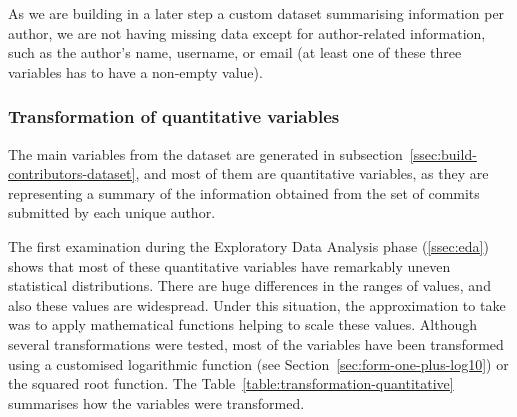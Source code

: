 \documentclass[a4paper, 12pt]{book}
\begin{document}
As we are building in a later step a custom dataset summarising information per author, we are not having missing data except for author-related information, such as the author's name, username, or email (at least one of these three variables has to have a non-empty value).

\subsubsection{Transformation of quantitative variables}
\label{sssec:transformation-quantitative}

The main variables from the dataset are generated in subsection~\ref{ssec:build-contributors-dataset}, and most of them are quantitative variables, as they are representing a summary of the information obtained from the set of commits submitted by each unique author.

The first examination during the Exploratory Data Analysis phase (\ref{ssec:eda}) shows that most of these quantitative variables have remarkably
uneven statistical distributions. There are huge differences in the ranges of values, and also these values are widespread. Under this situation, the
approximation to take was to apply mathematical functions helping to scale these values. Although several transformations were tested, most of the 
variables have been transformed using a customised logarithmic function (see Section~\ref{sec:form-one-plus-log10}) or the squared root function.
The Table~\ref{table:transformation-quantitative} summarises how the variables were transformed. 
\end{document}
